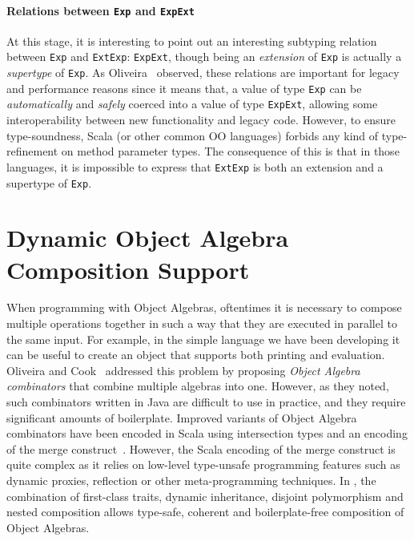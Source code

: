 \paragraph{Relations between \lstinline{Exp} and \lstinline{ExpExt}}
At this stage, it is interesting to point out an interesting subtyping relation
between \lstinline{Exp} and \lstinline{ExtExp}: \lstinline{ExpExt}, though being an
\emph{extension} of \lstinline{Exp} is actually a \emph{supertype} of \lstinline{Exp}.
As Oliveira~\citep{oliveira09modular} observed, these relations are
important for legacy and performance reasons since it means that, a value of
type \lstinline{Exp} can be \emph{automatically} and \emph{safely}
coerced into a value of type \lstinline{ExpExt}, allowing some
interoperability between new functionality and legacy code.
However, to ensure type-soundness, Scala (or other common OO languages) forbids any kind of type-refinement on method
parameter types. The consequence of this is that in those languages, it is
impossible to express that \lstinline{ExtExp} is both an extension and a
supertype of \lstinline{Exp}.




\section{Dynamic Object Algebra Composition Support}

When programming with Object Algebras, oftentimes it is necessary to compose
multiple operations together in such a way that they are executed in parallel to
the same input. For example, in the simple language we have been developing it
can be useful to create an object that supports both printing and evaluation.
Oliveira and Cook~\citep{oliveira2012extensibility} addressed this problem by
proposing \emph{Object Algebra combinators} that combine multiple algebras into
one. However, as they noted, such combinators written in Java are difficult to
use in practice, and they require significant amounts of boilerplate. Improved
variants of Object Algebra combinators have been encoded in Scala using
intersection types and an encoding of the merge
construct~\citep{oliveira2013feature, rendel14attributes}. However, the Scala
encoding of the merge construct is quite complex as it relies on low-level
type-unsafe programming features such as dynamic proxies, reflection or other
meta-programming techniques. In \sedel, the combination of first-class traits,
dynamic inheritance, disjoint polymorphism and nested composition allows type-safe, coherent and
boilerplate-free composition of Object Algebras.

